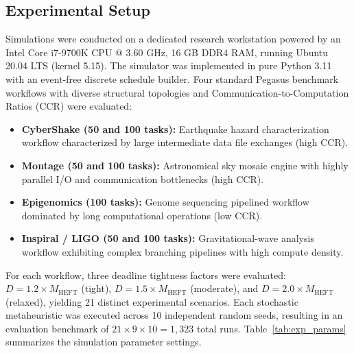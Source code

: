 \documentclass[journal]{IEEEtran}
\begin{document}
\subsection{Experimental Setup}
Simulations were conducted on a dedicated research workstation powered by an Intel Core i7-9700K CPU @ 3.60 GHz, 16 GB DDR4 RAM, running Ubuntu 20.04 LTS (kernel 5.15). The simulator was implemented in pure Python 3.11 with an event-free discrete schedule builder. Four standard Pegasus benchmark workflows \cite{pegasus2015} with diverse structural topologies and Communication-to-Computation Ratios (CCR) were evaluated:
\begin{itemize}
    \item \textbf{CyberShake (50 and 100 tasks):} Earthquake hazard characterization workflow characterized by large intermediate data file exchanges (high CCR).
    \item \textbf{Montage (50 and 100 tasks):} Astronomical sky mosaic engine with highly parallel I/O and communication bottlenecks (high CCR).
    \item \textbf{Epigenomics (100 tasks):} Genome sequencing pipelined workflow dominated by long computational operations (low CCR).
    \item \textbf{Inspiral / LIGO (50 and 100 tasks):} Gravitational-wave analysis workflow exhibiting complex branching pipelines with high compute density.
\end{itemize}

For each workflow, three deadline tightness factors were evaluated: $D = 1.2 \times M_{\text{HEFT}}$ (tight), $D = 1.5 \times M_{\text{HEFT}}$ (moderate), and $D = 2.0 \times M_{\text{HEFT}}$ (relaxed), yielding 21 distinct experimental scenarios. Each stochastic metaheuristic was executed across 10 independent random seeds, resulting in an evaluation benchmark of $21 \times 9 \times 10 = 1,323$ total runs. Table~\ref{tab:exp_params} summarizes the simulation parameter settings.
\end{document}
